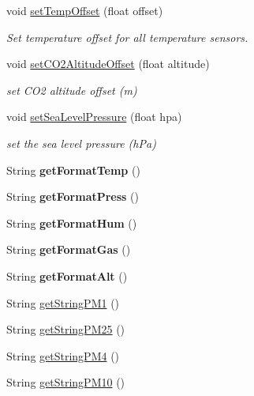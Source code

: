 \begin{DoxyCompactItemize}
void \hyperlink{classSensors_a122c0d2922d2a80984e8a3ac21b883c3}{set\+Temp\+Offset} (float offset)
\begin{DoxyCompactList}\small\item\em Set temperature offset for all temperature sensors. \end{DoxyCompactList}\item 
void \hyperlink{classSensors_a27eec756609a421b3927c0dc132ae7c6}{set\+C\+O2\+Altitude\+Offset} (float altitude)
\begin{DoxyCompactList}\small\item\em set C\+O2 altitude offset (m) \end{DoxyCompactList}\item 
void \hyperlink{classSensors_a8fe6e43b99919f6c481792f0c0de8c50}{set\+Sea\+Level\+Pressure} (float hpa)
\begin{DoxyCompactList}\small\item\em set the sea level pressure (h\+Pa) \end{DoxyCompactList}\item 
\mbox{\label{classSensors_a38f2ebcfa7900fe80972f43fbc70a84b}} 
String {\bfseries get\+Format\+Temp} ()
\item 
\mbox{\label{classSensors_ab163bc178118ee3ab5656792a6757254}} 
String {\bfseries get\+Format\+Press} ()
\item 
\mbox{\label{classSensors_a92a6d7a37877d373d9653d2327189238}} 
String {\bfseries get\+Format\+Hum} ()
\item 
\mbox{\label{classSensors_af4a5c493e024e724e0009bb95f588be8}} 
String {\bfseries get\+Format\+Gas} ()
\item 
\mbox{\label{classSensors_ab56838d386d6d71043d3ad0b97244d73}} 
String {\bfseries get\+Format\+Alt} ()
\item 
String \hyperlink{classSensors_a427616fc30b3d9e63ce6be5032b614c2}{get\+String\+P\+M1} ()
\item 
String \hyperlink{classSensors_ab07001101683393a4cc3609ac6449b3c}{get\+String\+P\+M25} ()
\item 
String \hyperlink{classSensors_ab4eb2c9e8cd83823dfedb2c72aa2b405}{get\+String\+P\+M4} ()
\item 
String \hyperlink{classSensors_ab5eb58786c893bd552ef14516489c50d}{get\+String\+P\+M10} ()

\end{DoxyCompactItemize}
